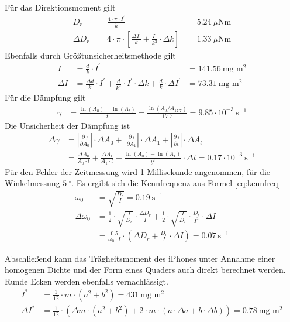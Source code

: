 \documentclass{article}
\begin{document}
Für das Direktionsmoment gilt
\begin{align}
D_r &= \frac{4\cdot\pi\cdot I^\prime}{k} &= 5.24~\mu\text{Nm}\\
\Delta D_r &= 4\cdot\pi\cdot \left[ \frac{\Delta I^\prime}{k} + \frac{I^\prime}{k^2}\cdot \Delta k \right]  &= 1.33~\mu\text{Nm}
\end{align}
Ebenfalls durch Größtunsicherheitsmethode gilt
\begin{align}
I &= \frac{d}{k}\cdot I^\prime  &= 141.56~\text{mg m}^2 \\
\Delta I &= \frac{\Delta d}{k}\cdot I^\prime +\frac{d}{k^2}\cdot I^\prime\cdot \Delta k +\frac{d}{k}\cdot \Delta I^\prime &= 73.31~\text{mg m}^2 
\end{align}
Für die Dämpfung gilt 
\begin{align}
\gamma &= \frac{\ln(A_0) - \ln(A_t)}{t} = \frac{\ln(A_0 / A_{17.7})}{17.7} = 9.85\cdot 10^{-3}~\text{s}^{-1}
\end{align}
Die Unsicherheit der Dämpfung ist
\begin{align}
\Delta \gamma &= \left| \frac{\partial \gamma}{\partial A_0} \right|\cdot \Delta A_0 + \left| \frac{\partial \gamma}{\partial A_1} \right|\cdot \Delta A_1 + \left| \frac{\partial \gamma}{\partial t} \right|\cdot \Delta A_t \\
&= \frac{\Delta A_0}{A_0 \cdot t} +\frac{\Delta A_1}{A_1 \cdot t} + \frac{\ln(A_0) - \ln(A_1)}{t^2}\cdot \Delta t = 0.17\cdot10^{-3}~\text{s}^{-1}
\end{align}
Für den Fehler der Zeitmessung wird 1 Millisekunde angenommen, für die Winkelmessung $5~^\circ$.
Es ergibt sich die Kennfrequenz aus Formel \eqref{eq:kennfreq}
\begin{align}
\omega_0 &= \sqrt{\frac{D_r}{I}}  = 0.19~\text{s}^{-1} \\
\Delta \omega_0 &= \frac{1}{2} \cdot \sqrt{\frac{I}{D_r}} \cdot \frac{\Delta D_r}{I} + \frac{1}{2}\cdot  \sqrt{\frac{I}{D_r}} \cdot \frac{D_r}{I^2}\cdot \Delta I  \\
&= \frac{0.5}{\omega_0 \cdot I} \cdot \left( \Delta D_r + \frac{D_r}{I}\cdot \Delta I \right) = 0.07~\text{s}^{-1}
\end{align}


Abschließend kann das Trägheitsmoment des iPhones unter Annahme einer homogenen Dichte und der Form eines Quaders auch direkt berechnet werden. Runde Ecken werden ebenfalls vernachlässigt.
\begin{align*}
I^* &= \frac{1}{12}\cdot m \cdot (a^2 + b^2) = 431~\text{mg m}^2 \\
\Delta I^* &= \frac{1}{12}\cdot \left( \Delta m \cdot (a^2 + b^2) + 2\cdot m \cdot (a\cdot \Delta a + b \cdot \Delta b)  \right) = 0.78~\text{mg m}^2
\end{align*}
\end{document}
